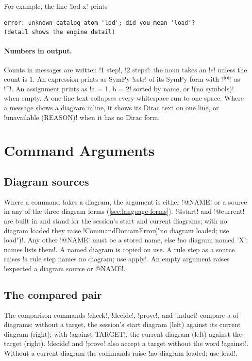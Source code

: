 For example, the line \code!lod x! prints
\begin{lstlisting}[style=grammar]
error: unknown catalog atom 'lod'; did you mean 'load'?
(detail shows the engine detail)
\end{lstlisting}

\paragraph{Numbers in output.} Counts in messages are written \code!1 step!, \code!2 steps!: the noun takes an \code!s! unless the count is $1$. An expression prints as SymPy \py!sstr! of its SymPy form with \code!**! as \code!^!. An assignment prints as \code!a = 1, b = 2! sorted by name, or \code!(no symbols)! when empty. A one-line text collapses every whitespace run to one space. Where a message shows a diagram inline, it shows its Dirac text on one line, or \code!unavailable (REASON)! when it has no Dirac form.

\section{Command Arguments}\label{sec:language-args}

\subsection{Diagram sources}

Where a command takes a diagram, the argument is either \code!@NAME! or a source in any of the three diagram forms (\cref{sec:language-forms}). \code!@start! and \code!@current! are built in and stand for the session's start and current diagrams; with no diagram loaded they raise \code!CommandDomainError("no diagram loaded; use load")!. Any other \code!@NAME! must be a stored name, else \code!no diagram named 'X'; names lists them!. A named diagram is copied on use. A rule step as a source raises \code!a rule step names no diagram; use apply!. An empty argument raises \code!expected a diagram source or @NAME!.

\subsection{The compared pair}

The comparison commands \azx!check!, \azx!decide!, \azx!prove!, and \azx!induct! compare a  of diagrams: without a target, the session's start diagram (left) against its current diagram (right); with \code!against TARGET!, the current diagram (left) against the target (right). \azx!decide! and \azx!prove! also accept a target without the word \code!against!. Without a current diagram the commands raise \code!no diagram loaded; use load!.

